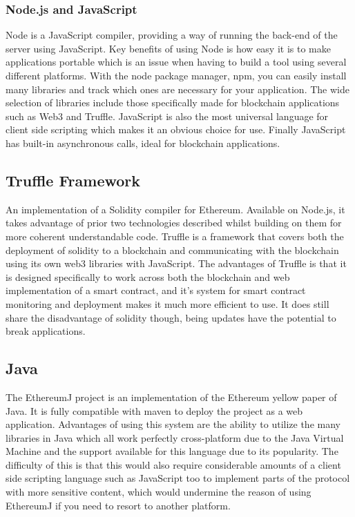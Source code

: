 \documentclass{entcs}
\begin{document}
\subsubsection{Node.js and JavaScript}
Node is a JavaScript compiler, providing a way of running the back-end of the server using JavaScript. Key benefits of using Node is how easy it is to make applications portable which is an issue when having to build a tool using several different platforms. With the node package manager, npm, you can easily install many libraries and track which ones are necessary for your application. The wide selection of libraries include those specifically made for blockchain applications such as Web3 and Truffle. JavaScript is also the most universal language for client side scripting which makes it an obvious choice for use. Finally JavaScript has built-in asynchronous calls, ideal for blockchain applications.

\subsection{Truffle Framework}
An implementation of a Solidity compiler for Ethereum. Available on Node.js, it takes advantage of prior two technologies described whilst building on them for more coherent understandable code. Truffle \cite{truffle} is a framework that covers both the deployment of solidity to a blockchain and communicating with the blockchain using its own web3 libraries with JavaScript. The advantages of Truffle is that it is designed specifically to work across both the blockchain and web implementation of a smart contract, and it's system for smart contract monitoring and deployment makes it much more efficient to use. It does still share the disadvantage of solidity though, being updates have the potential to break applications.

\subsection{Java}
The EthereumJ \cite{EthereumJ} project is an implementation of the Ethereum yellow paper of Java. It is fully compatible with maven to deploy the project as a web application. Advantages of using this system are the ability to utilize the many libraries in Java which all work perfectly cross-platform due to the Java Virtual Machine and the support available for this language due to its popularity. The difficulty of this is that this would also require considerable amounts of a client side scripting language such as JavaScript too to implement parts of the protocol with more sensitive content, which would undermine the reason of using EthereumJ if you need to resort to another platform. 
\end{document}
